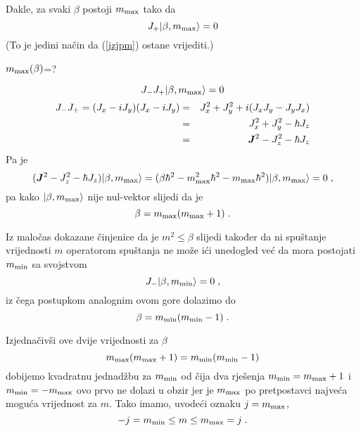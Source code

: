 Dakle, za svaki $\beta$ postoji $m_{\textrm{\scriptsize max}}$ tako da 
\begin{displaymath}
 J_+ | \beta, m_{\textrm{\scriptsize max}} \rangle = 0
\end{displaymath}
(To je jedini način da (\ref{jzjpm}) ostane vrijediti.)

$m_{\textrm{\scriptsize max}}(\beta)$=?

\begin{displaymath}
J_- J_+ | \beta, m_{\textrm{\scriptsize max}} \rangle = 0
\end{displaymath}
\begin{eqnarray*}
J_- J_+ =(J_x - i J_y)(J_x - i J_y)
   & = &J_{x}^2 + J_{y}^2 +i (J_x J_y - J_y J_x) \\
 & = & J_{x}^2 + J_{y}^2 - \hbar J_z \\
 & = & \jsq - J_{z}^2 - \hbar J_z
\end{eqnarray*}
Pa je
\begin{displaymath}
 (\jsq - J_{z}^2 - \hbar J_z)\ket{\beta, m_{\textrm{\scriptsize max}}}
 = (\beta\hbar^2 - m_{\textrm{\scriptsize max}}^2 \hbar^2 
                 - m_{\textrm{\scriptsize max}}   \hbar^2 )
\ket{\beta, m_{\textrm{\scriptsize max}}} = 0 \;,
\end{displaymath}
pa kako $| \beta, m_{\textrm{\scriptsize max}} \rangle$ nije nul-vektor
slijedi da je
\begin{displaymath}
    \beta = m_{\textrm{\scriptsize max}} ( m_{\textrm{\scriptsize max}} +1)\;.
\end{displaymath}

Iz maločas dokazane činjenice da je $m^2 \le \beta$ slijedi također
da ni spuštanje vrijednosti $m$ operatorom spuštanja ne može ići
unedogled već da mora postojati $m_{\textrm{\scriptsize min}}$
sa svojstvom
\begin{displaymath}
    J_- | \beta, m_{\textrm{\scriptsize min}} \rangle = 0 \;,
\end{displaymath}
iz čega postupkom analognim ovom gore dolazimo do
\begin{displaymath}
    \beta = m_{\textrm{\scriptsize min}} ( m_{\textrm{\scriptsize min}} -1)\;.
\end{displaymath}

Izjednačivši ove dvije vrijednosti za $\beta$ 
\begin{displaymath}
            m_{\textrm{\scriptsize max}} ( m_{\textrm{\scriptsize max}} +1)
= m_{\textrm{\scriptsize min}} ( m_{\textrm{\scriptsize min}} -1)
\end{displaymath}
dobijemo kvadratnu jednadžbu za $m_{\textrm{\scriptsize min}}$ od čija
dva rješenja $m_{\textrm{\scriptsize min}}=m_{\textrm{\scriptsize max}}+1$
i $m_{\textrm{\scriptsize min}} = - m_{\textrm{\scriptsize max}}$ ovo
prvo ne dolazi u obzir jer je $m_{\textrm{\scriptsize max}}$ po pretpostavci
najveća moguća vrijednost za $m$. Tako imamo, uvodeći oznaku
$j=m_{\textrm{\scriptsize max}}$,
\begin{displaymath}
               -j = m_{\textrm{\scriptsize min}} \le m \le 
 m_{\textrm{\scriptsize max}} = j   \;.
\end{displaymath}


